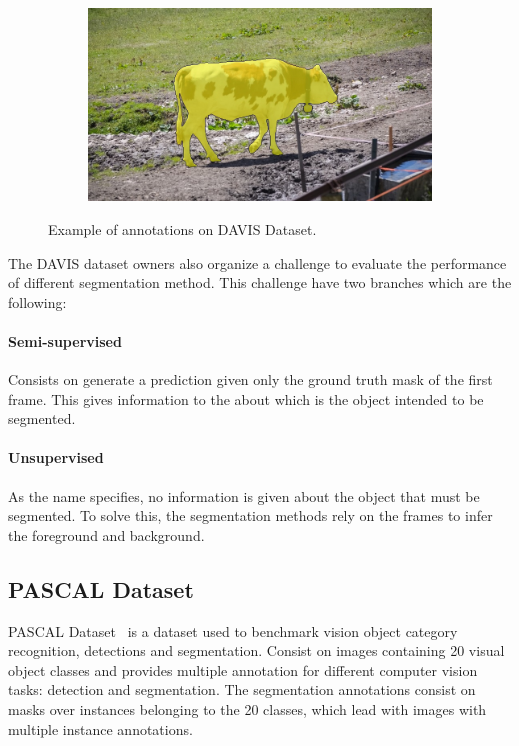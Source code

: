 \begin{figure}
\begin{subfigure}{0.25\textwidth}
\end{subfigure}%
\begin{subfigure}{0.25\textwidth}
  \includegraphics[width=1.\linewidth]{figures/davis_dataset/cow.jpg}
\end{subfigure}
\caption{Example of annotations on DAVIS Dataset.}
\label{fig:davis}
\end{figure}


The DAVIS dataset owners also organize a challenge to evaluate the performance of different segmentation method.
This challenge have two branches which are the following:

\paragraph{Semi-supervised}

Consists on generate a prediction given only the ground truth mask of the first frame.
This gives information to the about which is the object intended to be segmented.

\paragraph{Unsupervised}

As the name specifies, no information is given about the object that must be segmented.
To solve this, the segmentation methods rely on the frames to infer the foreground and background.

\subsection{PASCAL Dataset}

PASCAL Dataset~\cite{Everingham10} is a dataset used to benchmark vision object category recognition, detections and segmentation.
Consist on images containing 20 visual object classes and provides multiple annotation for different computer vision tasks: detection and segmentation.
The segmentation annotations consist on masks over instances belonging to the 20 classes, which lead with images with multiple instance annotations.

